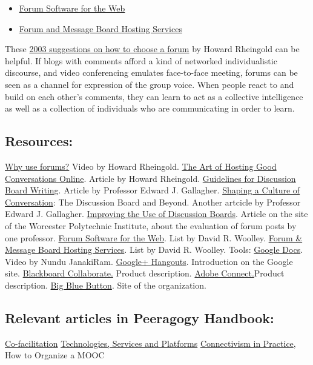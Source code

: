 \begin{itemize}
\item
  \href{http://thinkofit.com/webconf/forumsoft.htm}{Forum Software for
  the Web}
\item
  \href{http://thinkofit.com/webconf/hostsites.htm}{Forum and Message
  Board Hosting Services}
\end{itemize}
These
\href{https://docs.google.com/document/d/1D606u7SfVD3p7xH0lbf2mOO1hIdX97r7kVe753hSYeE/edit}{2003
suggestions on how to choose a forum} by Howard Rheingold can be
helpful. If blogs with comments afford a kind of networked
individualistic discourse, and video conferencing emulates face-to-face
meeting, forums can be seen as a channel for expression of the group
voice. When people react to and build on each other's comments, they can
learn to act as a collective intelligence as well as a collection of
individuals who are communicating in order to learn.

\subsection{Resources:}

\href{http://blip.tv/file/1123048}{Why use forums?} Video by Howard
Rheingold. \href{http://www.rheingold.com/texts/artonlinehost.html}{The
Art of Hosting Good Conversations Online}. Article by Howard Rheingold.
\href{http://www.lehigh.edu/~indiscus/doc\_guidelines.html}{Guidelines
for Discussion Board Writing}. Article by Professor Edward J. Gallagher.
\href{http://academiccommons.org/commons/essay/shaping-culture-conversation}{Shaping
a Culture of Conversation}: The Discussion Board and Beyond. Another
artcicle by Professor Edward J. Gallagher.
\href{http://www.wpi.edu/Academics/ATC/Collaboratory/Idea/boards.html}{Improving
the Use of Discussion Boards}. Article on the site of the Worcester
Polytechnic Institute, about the evaluation of forum posts by one
professor. \href{http://thinkofit.com/webconf/forumsoft.htm}{Forum
Software for the Web}. List by David R. Woolley.
\href{http://thinkofit.com/webconf/hostsites.htm}{Forum \& Message Board
Hosting Services}. List by David R. Woolley. Tools:
\href{http://youtu.be/VVFbqHhkb-k}{Google Docs}. Video by Nundu
JanakiRam. \href{http://www.google.com/+/learnmore/hangouts/}{Google+
Hangouts}. Introduction on the Google site.
\href{http://www.blackboard.com/Platforms/Collaborate/Products/Blackboard-Collaborate.aspx}{Blackboard
Collaborate.} Product description.
\href{http://www.adobe.com/products/adobeconnect.html}{Adobe
Connect.}Product description. \href{http://www.bigbluebutton.org/}{Big
Blue Button}. Site of the organization.

\subsection{Relevant articles in Peeragogy Handbook:}

\href{http://peeragogy.org/co-facilitation-refactor/}{Co-facilitation}
\href{http://peeragogy.org/resources/technologies/}{Technologies,
Services and Platforms}
\href{http://peeragogy.org/organizing-a-learning-context/connectivism-in-practice-how-to-organize-a-mooc/}{Connectivism
in Practice}, How to Organize a MOOC
